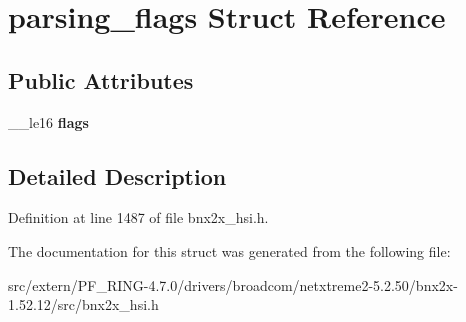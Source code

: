 \hypertarget{structparsing__flags}{
\section{parsing\_\-flags Struct Reference}
\label{structparsing__flags}
}
\subsection*{Public Attributes}
\begin{DoxyCompactItemize}
\item 
\hypertarget{structparsing__flags_a531527fc493def405c8157996952beff}{
\_\-\_\-le16 {\bfseries flags}}
\label{structparsing__flags_a531527fc493def405c8157996952beff}

\end{DoxyCompactItemize}


\subsection{Detailed Description}


Definition at line 1487 of file bnx2x\_\-hsi.h.



The documentation for this struct was generated from the following file:\begin{DoxyCompactItemize}
\item 
src/extern/PF\_\-RING-\/4.7.0/drivers/broadcom/netxtreme2-\/5.2.50/bnx2x-\/1.52.12/src/bnx2x\_\-hsi.h\end{DoxyCompactItemize}
